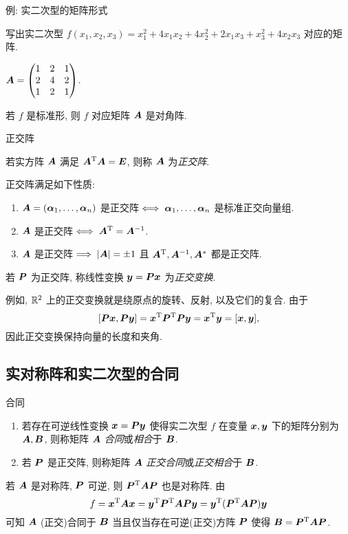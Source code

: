 \begin{frame}{例: 实二次型的矩阵形式}
	\onslide<+->
	\begin{example}
		写出实二次型 $f(x_1,x_2,x_3)=x_1^2+4x_1x_2+4x_2^2+2x_1x_3+x_3^2+4x_2x_3$ 对应的矩阵.
	\end{example}
	\onslide<+->
	\begin{solution}
		$\bfA=\begin{pmatrix}
			1&2&1\\
			2&4&2\\
			1&2&1
		\end{pmatrix}$.
	\end{solution}
	\onslide<+->
	若 $f$ 是标准形, 则 $f$ 对应矩阵 $\bfA$ 是对角阵.
\end{frame}


\begin{frame}{正交阵}
	\onslide<+->
	\begin{definition}
		若实方阵 $\bfA$ 满足 $\bfA^\rmT\bfA=\bfE$, 则称 $\bfA$ 为\emph{正交阵}.
	\end{definition}
	\onslide<+->
	正交阵满足如下性质:
	\begin{enumerate}
		\item $\bfA=(\bma_1,\dots,\bma_n)$ 是正交阵$\iff \bma_1,\dots,\bma_n$ 是标准正交向量组.
		\item $\bfA$ 是正交阵$\iff\bfA^\rmT=\bfA^{-1}$.
		\item $\bfA$ 是正交阵$\implies|\bfA|=\pm1$ 且 $\bfA^\rmT,\bfA^{-1},\bfA^*$ 都是正交阵.
	\end{enumerate}
	\onslide<+->
	\begin{definition}
		若 $\bfP$ 为正交阵, 称线性变换 $\bfy=\bfP\bfx$ 为\emph{正交变换}.
	\end{definition}
	\onslide<+->
	例如, $\BR^2$ 上的正交变换就是绕原点的旋转、反射, 以及它们的复合.
	\onslide<+->
	由于
	\[[\bfP\bfx,\bfP\bfy]=\bfx^\rmT\bfP^\rmT\bfP\bfy=\bfx^\rmT\bfy=[\bfx,\bfy],\]
	因此\alert{正交变换保持向量的长度和夹角}.
\end{frame}


\subsection{实对称阵和实二次型的合同}
\begin{frame}{合同}
	\onslide<+->
	\begin{definition}
		\begin{enumerate}
			\item 若存在可逆线性变换 $\bfx=\bfP\bfy$ 使得实二次型 $f$ 在变量 $\bfx,\bfy$ 下的矩阵分别为 $\bfA,\bfB$, 则称矩阵 $\bfA$ \emph{合同}或\emph{相合}于 $\bfB$.
			\item 若 $\bfP$ 是正交阵, 则称矩阵 $\bfA$ \emph{正交合同}或\emph{正交相合}于 $\bfB$.
		\end{enumerate}
	\end{definition}
	\onslide<+->
	若 $\bfA$ 是对称阵, $\bfP$ 可逆, 则 $\bfP^\rmT\bfA\bfP$ 也是对称阵.
	\onslide<+->
	由
	\[f=\bfx^\rmT\bfA\bfx=\bfy^\rmT\bfP^\rmT\bfA\bfP\bfy
	=\bfy^\rmT(\bfP^\rmT\bfA\bfP)\bfy\]
	可知 $\bfA$ (正交)合同于 $\bfB$ 当且仅当存在可逆(正交)方阵 $\bfP$ 使得 $\bfB=\bfP^\rmT\bfA\bfP$.
\end{frame}


